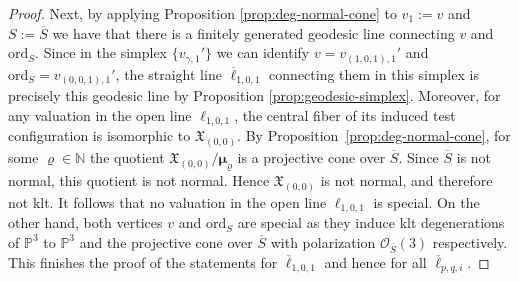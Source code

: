 \documentclass[reqno, 12pt]{amsart}
\theoremstyle{definition}
\newcommand{\bP}{\mathbb{P}}
\newcommand{\bN}{\mathbb{N}}
\newcommand{\cO}{\mathcal{O}}
\newcommand{\ord}{\mathrm{ord}}
\newcommand{\fX}{\mathfrak{X}}
\newcommand{\bmu}{\boldsymbol{\mu}}
\newcommand{\oS}{\overline{S}}
\newcommand{\oell}{\overline{\ell}}
\numberwithin{equation}{section}
\begin{document}
\begin{proof}
Next, by applying Proposition \ref{prop:deg-normal-cone} to $v_1:=v$ and $S:= \oS$ we have that there is a finitely generated geodesic line connecting $v$ and $\ord_{S}$. Since in the simplex $\{v_{\gamma, 1}'\}$ we can identify $v= v_{(1,0,1),1}'$ and $\ord_S = v_{(0,0,1),1}'$, the straight line  $\oell_{1,0,1}$ connecting them in this simplex is precisely this geodesic line by Proposition \ref{prop:geodesic-simplex}. Moreover, for any valuation in the open line
$\ell_{1,0,1}$, the central fiber of its induced test
configuration is isomorphic to $\fX_{(0,0)}$. By
Proposition~\ref{prop:deg-normal-cone}, for some $\varrho\in\bN$ the quotient
$\fX_{(0,0)}/\bmu_{\varrho}$
is a projective cone over $\oS$. Since $\oS$ is not normal,
this quotient is not normal. Hence $\fX_{(0,0)}$ is not
normal, and therefore not klt. It follows that no valuation
in the open line $\ell_{1,0,1}$ is special. On the other hand, both vertices $v$ and $\ord_S$ are special as they induce klt degenerations of $\bP^3$ to $\bP^3$ and the projective cone over $\oS$ with polarization $\cO_{\oS}(3)$ respectively. This finishes the proof of the statements for $\oell_{1,0,1}$ and hence for all $\oell_{p,q,i}$.
\end{proof}
\end{document}
